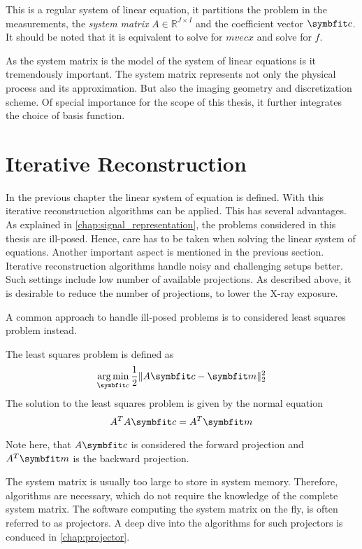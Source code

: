 This is a regular system of linear equation, it partitions the problem in the measurements, the
\textit{system matrix} \(A \in \mathbb{R}^{J \times I}\) and the coefficient vector \(\mvec{c}\).
It should be noted that it is equivalent to solve for \(mvec{x}\) and solve for \(f\).

As the system matrix is the model of the system of linear equations is it tremendously important.
The system matrix represents not only the physical process and its approximation. But also the
imaging geometry and discretization scheme. Of special importance for the scope of this thesis, it
further integrates the choice of basis function.

\section{Iterative Reconstruction}\label{sec:iterative_reconstruction}

In the previous chapter the linear system of equation is defined. With this iterative reconstruction
algorithms can be applied. This has several advantages. As explained in
\autoref{chap:signal_representation}, the problems considered in this thesis are ill-posed. Hence,
care has to be taken when solving the linear system of equations. Another important aspect is
mentioned in the previous section. Iterative reconstruction algorithms handle noisy and challenging
setups better. Such settings include low number of available projections. As described above, it is
desirable to reduce the number of projections, to lower the X-ray exposure.

A common approach to handle ill-posed problems is to considered least squares problem instead.
\begin{definition}\label{def:least_squares_problem}
	The least squares problem is defined as
	\[ \argmin_{\mvec{c}} \frac{1}{2} \norm{A\mvec{c} - \mvec{m}}^2_2 \]
	The solution to the least squares problem is given by the normal equation
	\[ A^T A \mvec{c} = A^T \mvec{m} \]
\end{definition}
Note here, that \(A\mvec{c}\) is considered the forward projection and \(A^T \mvec{m}\) is the
backward projection.

The system matrix is usually too large to store in system memory. Therefore, algorithms are
necessary, which do not require the knowledge of the complete system matrix. The software computing
the system matrix on the fly, is often referred to as projectors. A deep dive into the algorithms
for such projectors is conduced in \autoref{chap:projector}.

